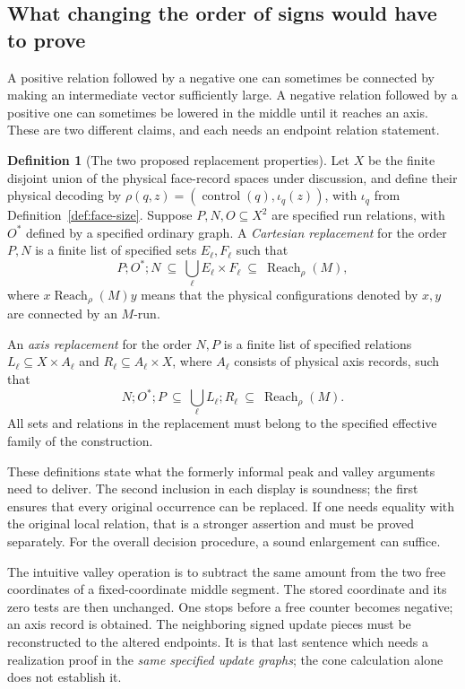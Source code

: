 \documentclass[11pt,a4paper]{article}
\theoremstyle{definition}
\newtheorem{definition}[theorem]{Definition}
\theoremstyle{remark}
\newcommand{\Reach}{\operatorname{Reach}}
\begin{document}
\subsection{What changing the order of signs would have to prove}

A positive relation followed by a negative one can sometimes be
connected by making an intermediate vector sufficiently large.
A negative relation followed by a positive one can sometimes be
lowered in the middle until it reaches an axis.
These are two different claims, and each needs an endpoint relation
statement.

\begin{definition}[The two proposed replacement properties]
\label{def:replacements}
Let \(X\) be the finite disjoint union of the physical face-record
spaces under discussion, and define their physical decoding by
\(\rho(q,z)=(\operatorname{control}(q),\iota_q(z))\), with
\(\iota_q\) from Definition~\ref{def:face-size}.
Suppose \(P,N,O\subseteq X^2\) are specified run relations, with
\(O^*\) defined by a specified ordinary graph.
A \emph{Cartesian replacement} for the order \(P,N\) is a finite
list of specified sets \(E_\ell,F_\ell\) such that
\[
 P;O^*;N\ \subseteq\
       \bigcup_\ell E_\ell\times F_\ell
       \ \subseteq\ \Reach_{\rho}(M),
 \tag{PK}
\]
where \(x\Reach_\rho(M)y\) means that the physical configurations
denoted by \(x,y\) are connected by an \(M\)-run.

An \emph{axis replacement} for the order \(N,P\) is a finite list of
specified relations \(L_\ell\subseteq X\times A_\ell\) and
\(R_\ell\subseteq A_\ell\times X\), where \(A_\ell\) consists of
physical axis records, such that
\[
 N;O^*;P\ \subseteq\
       \bigcup_\ell L_\ell;R_\ell
       \ \subseteq\ \Reach_\rho(M).
 \tag{VL}
\]
All sets and relations in the replacement must belong to the
specified effective family of the construction.
\end{definition}

These definitions state what the formerly informal peak and valley
arguments need to deliver. The second inclusion in each display is
soundness; the first ensures that every original occurrence can be
replaced. If one needs equality with the original local relation,
that is a stronger assertion and must be proved separately.
For the overall decision procedure, a sound enlargement can suffice.

The intuitive valley operation is to subtract the same amount from
the two free coordinates of a fixed-coordinate middle segment.
The stored coordinate and its zero tests are then unchanged.
One stops before a free counter becomes negative; an axis record is
obtained. The neighboring signed update pieces must be reconstructed
to the altered endpoints. It is that last sentence which needs a
realization proof in the \emph{same specified update graphs}; the
cone calculation alone does not establish it.
\end{document}
